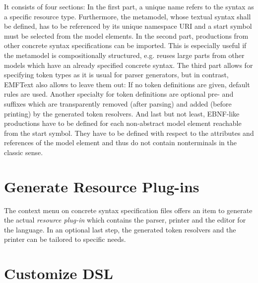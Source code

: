 It consists of four sections: In the first part, a unique
name refers to the syntax as a specific resource type. Furthermore, the metamodel, 
whose textual syntax shall be defined, has 
to be referenced by its  unique namespace URI and a start symbol must be selected from 
the model elements. In the second part, productions from other concrete syntax 
specifications can be imported. This is especially useful if the metamodel is 
compositionally structured, e.g. reuses large parts from other models which have an 
already specified concrete syntax.  The third part allows for specifying token types as
 it is usual for parser generators, but in contrast, EMFText also allows to leave them 
 out: If no token definitions are given, default rules are used. Another specialty for 
 token definitions are optional pre- and suffixes which are transparently removed (after 
 parsing) and added (before printing) by the generated token resolvers. And last but 
 not least, EBNF-like productions have to be defined for each non-abstract model element 
 reachable from the start symbol. They have to be defined with respect to the attributes 
 and references of the model element and thus do not contain nonterminals in the classic 
 sense.

\section{Generate Resource Plug-ins}

The context menu on concrete syntax specification files offers an item to generate the 
actual \emph{resource plug-in} which contains the parser, printer and the editor
for the language. In an optional last step, the generated token resolvers and the printer 
can be tailored to specific needs.

\section{Customize DSL}

